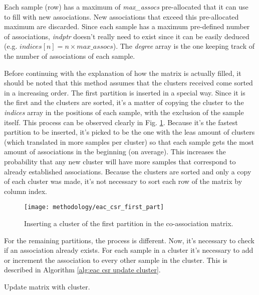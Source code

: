 Each sample (row) has a maximum of \emph{max\_assocs} pre-allocated that it can use to fill with new associations.
New associations that exceed this pre-allocated maximum are discarded.
Since each sample has a maximum pre-defined number of associations, \emph{indptr} doesn't really need to exist since it can be easily deduced (e.g. $indices[n] = n \times max\_assocs$). The \emph{degree} array is the one keeping track of the number of associations of each sample.

Before continuing with the explanation of how the matrix is actually filled, it should be noted that this method assumes that the clusters received come sorted in a increasing order.
The first partition is inserted in a special way.
Since it is the first and the clusters are sorted, it's a matter of copying the cluster to the \emph{indices} array in the positions of each sample, with the exclusion of the sample itself.
This process can be observed clearly in Fig. \ref{fig:first part}.
Because it's the fastest partition to be inserted, it's picked to be the one with the leas amount of clusters (which translated in more samples per cluster) so that each sample gets the most amount of associations in the beginning (on average).
This increases the probability that any new cluster will have more samples that correspond to already established associations.
Because the clusters are sorted and only a copy of each cluster was made, it's not necessary to sort each row of the matrix by column index.

\begin{figure}[hbtp]
\centering
\texttt{[image: methodology/eac\_csr\_first\_part]}
\caption{Inserting a cluster of the first partition in the co-association matrix.}
\label{fig:first part}
\end{figure}

For the remaining partitions, the process is different.
Now, it's necessary to check if an association already exists.
For each sample in a cluster it's necessary to add or increment the association to every other sample in the cluster.
This is described in Algorithm \ref{alg:eac csr update cluster}.


\begin{algorithm}
\caption{Update matrix with cluster.}\label{alg:eac csr update cluster}
\begin{algorithmic}[1]
		\Else
		\EndIf
	\EndFor
\EndFor
\EndProcedure
\end{algorithmic}
\end{algorithm}

